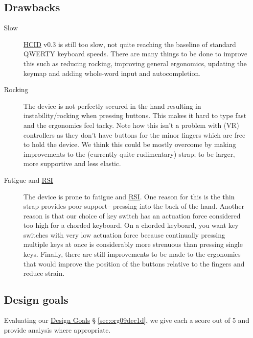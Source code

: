 \documentclass[logo,bsc,singlespacing,parskip]{infthesis}
\begin{document}
\subsection{Drawbacks}
\label{sec:org5383a0c}
\begin{description}
\item[{Slow}] \hyperref[org30e2275]{HCID} v0.3 is still too slow, not quite reaching the baseline of standard QWERTY keyboard speeds.
There are many things to be done to improve this such as reducing rocking, improving general ergonomics, updating the keymap and adding whole-word input and autocompletion.

\item[{Rocking}] The device is not perfectly secured in the hand resulting in instability/rocking when pressing buttons.
This makes it hard to type fast and the ergonomics feel tacky.
Note how this isn't a problem with (VR) controllers as they don't have buttons for the minor fingers which are free to hold the device.
We think this could be mostly overcome by making improvements to the (currently quite rudimentary) strap; to be larger, more supportive and less elastic.

\item[{Fatigue and \hyperref[orgc186d45]{RSI}}] The device is prone to fatigue and \hyperref[orgc186d45]{RSI}.
One reason for this is the thin strap provides poor support-- pressing into the back of the hand.
Another reason is that our choice of key switch has an actuation force considered too high for a chorded keyboard.
On a chorded keyboard, you want key switches with very low actuation force because continually pressing multiple keys at once is considerably more strenuous than pressing single keys.
Finally, there are still improvements to be made to the ergonomics that would improve the position of the buttons relative to the fingers and reduce strain.
\end{description}
\subsection{Design goals}
\label{sec:orge2218d2}
Evaluating our \hyperref[sec:org09dec1d]{Design Goals} § \ref{sec:org09dec1d}, we give each a score out of 5 and provide analysis where appropriate. \smallskip
\end{document}
